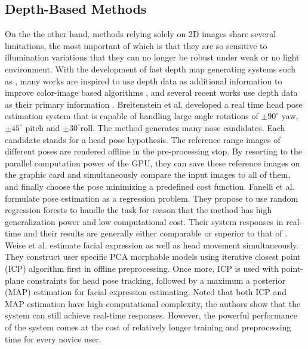 \subsection{Depth-Based Methods}
On the the other hand, methods relying solely on 2D images share several limitations, the most important of which is that they are so sensitive to illumination variations that they can no longer be robust under weak or no light environment. With the development of fast depth map generating systems such as \cite{Weise:07:F3SWAMC}, many works are inspired to use depth data as additional information to improve color-image based algorithms \cite{Yang:02:MBHPTWS,Morency:03:PEU3VBE,Seemann:04:HPEUSVFHRI}, and several recent works use depth data as their primary information \cite{Breitenstein:08:RTFPEFSRI,Malassiotis:05:RRHPEFRD,Fanelli:11:RTHPEWRRF,Weise:11:RPBFA}. Breitenstein et al. \cite{Breitenstein:08:RTFPEFSRI} developed a real time head pose estimation system that is capable of handling large angle rotations of $\pm 90^{\circ}$ yaw, $\pm 45^{\circ}$ pitch and $\pm 30^{\circ}$roll. The method generates many nose candidates. Each candidate  stands for a head pose hypothesis. The reference range images of different poses are rendered offline in the pre-processing stop. By resorting to the parallel computation power of the GPU, they can save these reference images on the graphic card and simultaneously compare the input images to all of them, and finally choose the pose minimizing a predefined cost function. Fanelli et al. \cite{Fanelli:11:RTHPEWRRF} formulate pose estimation as a regression problem. They propose to use random regression forests to handle the task for reason that the method has high generalization power and low computational cost. Their system responses in real-time and their results are generally either comparable or superior to that of \cite{Breitenstein:08:RTFPEFSRI}. Weise et al. \cite{Weise:11:RPBFA} estimate facial expression as well as head movement simultaneously. They construct user specific PCA morphable models using iterative closest point (ICP) algorithm first in offline preprocessing. Once more, ICP is used with point-plane constraints for head pose tracking, followed by a maximum a posterior (MAP) estimation for facial expression estimating. Noted that both ICP and MAP estimation have high computational complexity, the authors show that the system can still achieve real-time responses. However, the powerful performance of the system comes at the cost of relatively longer training and preprocessing time for every novice user.

